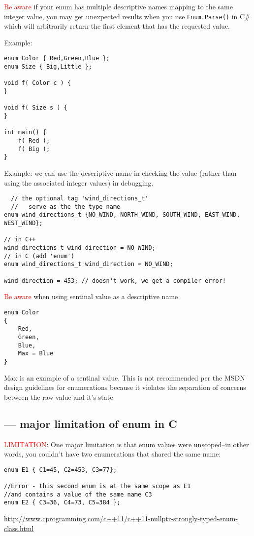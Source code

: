 \textcolor{red}{Be aware} if  your enum has multiple descriptive names mapping
to the same integer value, you may get unexpected results when you use
\verb!Enum.Parse()! in C\# which will arbitrarily return the first element that
has the requested value.


Example:
\begin{verbatim}
enum Color { Red,Green,Blue };
enum Size { Big,Little };

void f( Color c ) {
}

void f( Size s ) {
}

int main() {
    f( Red );
    f( Big );
}
\end{verbatim}

Example: we can use the descriptive name in checking the value (rather than
using the associated integer values) in debugging. 
\begin{verbatim}
  // the optional tag 'wind_directions_t' 
  //   serve as the the type name
enum wind_directions_t {NO_WIND, NORTH_WIND, SOUTH_WIND, EAST_WIND, WEST_WIND};

// in C++
wind_directions_t wind_direction = NO_WIND;
// in C (add 'enum')
enum wind_directions_t wind_direction = NO_WIND;

wind_direction = 453; // doesn't work, we get a compiler error!
\end{verbatim}



\textcolor{red}{Be aware} when using sentinal value as a descriptive name
\begin{verbatim}
enum Color 
{
    Red,
    Green,
    Blue,
    Max = Blue
}  
\end{verbatim}
Max is an example of a sentinal value. This is not recommended per the MSDN
design guidelines for enumerations because it violates the separation of
concerns between the raw value and it's state.

\subsection{--- major limitation of enum in C}
\label{sec:enum-limitations}

\textcolor{red}{LIMITATION}: One major limitation is that enum values were
unscoped--in other words, you couldn't have two enumerations that shared the
same name:
\begin{verbatim}
enum E1 { C1=45, C2=453, C3=77};

//Error - this second enum is at the same scope as E1
//and contains a value of the same name C3
enum E2 { C3=36, C4=73, C5=384 };
\end{verbatim}
\url{http://www.cprogramming.com/c++11/c++11-nullptr-strongly-typed-enum-class.html}

